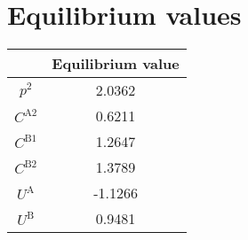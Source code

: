 

\section{Equilibrium values}


\begin{tabular}{c|c|}
  & Equilibrium value\\
\hline
$p^{\mathrm{2}}$ & 2.0362 \\
$C^{\mathrm{A2}}$ & 0.6211 \\
$C^{\mathrm{B1}}$ & 1.2647 \\
$C^{\mathrm{B2}}$ & 1.3789 \\
$U^{\mathrm{A}}$ & -1.1266 \\
$U^{\mathrm{B}}$ & 0.9481 \\
\hline
\end{tabular}


